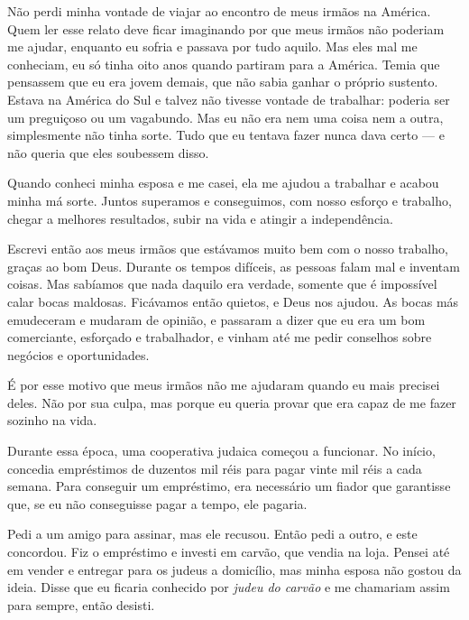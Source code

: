 Não perdi minha vontade de viajar ao encontro de meus irmãos
na América. Quem ler esse relato deve ficar imaginando por que meus irmãos não
poderiam me ajudar, enquanto eu sofria e passava por tudo aquilo. 
Mas eles mal me conheciam, eu só tinha oito anos quando partiram para a América. 
Temia que pensassem que eu era jovem demais, que não sabia ganhar o próprio sustento. 
Estava na América do Sul e talvez não tivesse vontade de
trabalhar: poderia ser um preguiçoso ou um vagabundo. Mas eu não era nem uma coisa
nem a outra, simplesmente não tinha sorte. Tudo que eu tentava fazer
nunca dava certo --- e não queria que eles soubessem disso.

Quando conheci minha esposa e me casei, ela me ajudou a trabalhar e
acabou minha má sorte. Juntos superamos e conseguimos, com nosso
esforço e trabalho, chegar a melhores resultados, subir
na vida e atingir a independência.

Escrevi então aos meus irmãos que estávamos muito bem com o nosso
trabalho, graças ao bom Deus. Durante os tempos difíceis, as
pessoas falam mal e inventam coisas. Mas sabíamos que
nada daquilo era verdade, somente que é impossível calar bocas maldosas.
Ficávamos então quietos, e Deus nos ajudou. As bocas más emudeceram e mudaram
de opinião, e passaram a dizer que eu era um bom comerciante, esforçado e trabalhador,
e vinham até me pedir conselhos sobre negócios e oportunidades.

É por esse motivo que meus irmãos não me ajudaram quando
eu mais precisei deles. Não por sua culpa, mas porque eu queria
provar que era capaz de me fazer sozinho na vida.


Durante essa época, uma cooperativa judaica começou a funcionar. No início, 
concedia empréstimos de duzentos mil réis para pagar vinte mil réis a
cada semana. Para conseguir um empréstimo, era necessário um fiador que garantisse que, 
se eu não conseguisse pagar a tempo, ele pagaria.

Pedi a um amigo para assinar, mas ele recusou. Então pedi a outro, e
este concordou. Fiz o empréstimo e investi em carvão, que vendia na loja.
Pensei até em vender e entregar para os judeus a domicílio, mas minha
esposa não gostou da ideia. Disse que eu ficaria conhecido por
\textit{judeu do carvão} e me chamariam assim para sempre, então desisti.

